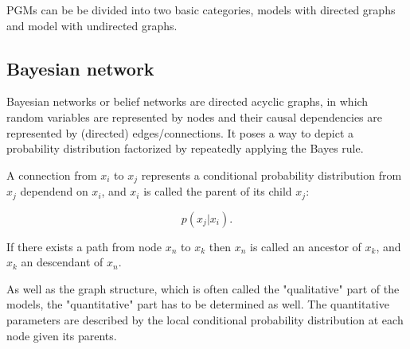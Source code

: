 PGMs can be be divided into two basic categories, models with directed graphs and model with undirected graphs.


\subsection{Bayesian network}

Bayesian networks or belief networks are directed acyclic graphs, in which random variables are represented by nodes and their causal dependencies are represented by (directed) edges/connections. 
It poses a way to depict a probability distribution factorized by repeatedly applying the Bayes rule.

A connection from $x_i$ to $x_j$ represents a conditional probability distribution from $x_j$ dependend on $x_i$, and $x_i$ is called the parent of its child $x_j$:

\[
p(x_j | x_i) .
\]


If there exists a path from node $x_n$ to $x_k$ then $x_n$ is called an ancestor of $x_k$, and $x_k$ an descendant of $x_n$. 

As well as the graph structure, which is often called the "qualitative" part of the models, the "quantitative" part has to be determined as well.
The quantitative parameters are described by the local conditional probability distribution at each node given its parents.


